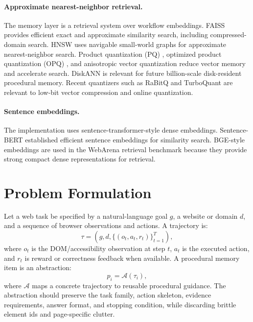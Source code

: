 \documentclass[11pt]{article}
\begin{document}
\paragraph{Approximate nearest-neighbor retrieval.}
The memory layer is a retrieval system over workflow embeddings. FAISS \citep{johnson2017faiss} provides efficient exact and approximate similarity search, including compressed-domain search. HNSW \citep{malkov2020hnsw} uses navigable small-world graphs for approximate nearest-neighbor search. Product quantization (PQ) \citep{jegou2011pq}, optimized product quantization (OPQ) \citep{ge2013opq}, and anisotropic vector quantization \citep{guo2019avq} reduce vector memory and accelerate search. DiskANN \citep{subramanya2019diskann} is relevant for future billion-scale disk-resident procedural memory. Recent quantizers such as RaBitQ \citep{gao2024rabitq} and TurboQuant \citep{zandieh2025turboquant} are relevant to low-bit vector compression and online quantization.

\paragraph{Sentence embeddings.}
The implementation uses sentence-transformer-style dense embeddings. Sentence-BERT \citep{reimers2019sentencebert} established efficient sentence embeddings for similarity search. BGE-style embeddings \citep{chen2024bge} are used in the WebArena retrieval benchmark because they provide strong compact dense representations for retrieval.

\section{Problem Formulation}

Let a web task be specified by a natural-language goal $g$, a website or domain $d$, and a sequence of browser observations and actions. A trajectory is:
\begin{equation}
  \tau = \left(g, d, \{(o_t, a_t, r_t)\}_{t=1}^{T}\right),
\end{equation}
where $o_t$ is the DOM/accessibility observation at step $t$, $a_t$ is the executed action, and $r_t$ is reward or correctness feedback when available. A procedural memory item is an abstraction:
\begin{equation}
  p_i = \mathcal{A}(\tau_i),
\end{equation}
where $\mathcal{A}$ maps a concrete trajectory to reusable procedural guidance. The abstraction should preserve the task family, action skeleton, evidence requirements, answer format, and stopping condition, while discarding brittle element ids and page-specific clutter.
\end{document}
